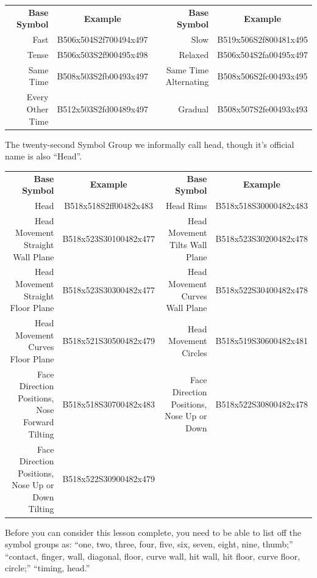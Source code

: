 \documentclass{article}
\begin{document}
\begin{center}
\begin{tabular}{rcrc}
\textbf{Base Symbol}&\textbf{Example}&\textbf{Base Symbol}&\textbf{Example}\\
Fast            &B506x504S2f700494x497&Slow                 &B519x506S2f800481x495\\
Tense           &B506x503S2f900495x498&Relaxed              &B506x504S2fa00495x497\\
Same Time       &B508x503S2fb00493x497&Same Time Alternating&B508x506S2fc00493x495\\
Every Other Time&B512x503S2fd00489x497&Gradual              &B508x507S2fe00493x493\\
\end{tabular}
\end{center}

The twenty-second Symbol Group we informally call head, though it's official name is also ``Head''.

\begin{center}
\begin{tabular}{rcrc}
\textbf{Base Symbol}&\textbf{Example}&\textbf{Base Symbol}&\textbf{Example}\\
Head                                             &B518x518S2ff00482x483&Head Rims                                &B518x518S30000482x483\\
Head Movement Straight Wall Plane                &B518x523S30100482x477&Head Movement Tilts Wall Plane           &B518x523S30200482x478\\
Head Movement Straight Floor Plane               &B518x523S30300482x477&Head Movement Curves Wall Plane          &B518x522S30400482x478\\
Head Movement Curves Floor Plane                 &B518x521S30500482x479&Head Movement Circles                    &B518x519S30600482x481\\
Face Direction Positions, Nose Forward Tilting   &B518x518S30700482x483&Face Direction Positions, Nose Up or Down&B518x522S30800482x478\\
Face Direction Positions, Nose Up or Down Tilting&B518x522S30900482x479\\
\end{tabular}
\end{center}

Before you can consider this lesson complete, you need to be able to list off the symbol groups as:
``one, two, three, four, five, six, seven, eight, nine, thumb;''
``contact, finger, wall, diagonal, floor, curve wall, hit wall, hit floor, curve floor, circle;''
``timing, head.''
\end{document}
